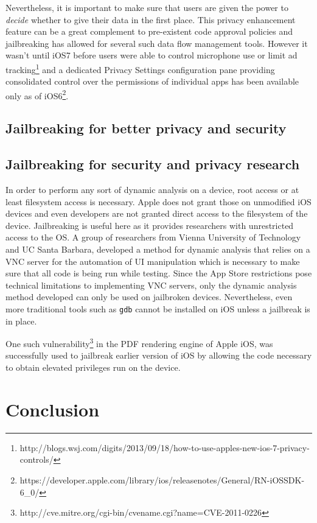 \documentclass[12pt, titlepage, oneside]{article}
\newcommand{\tab}{\hspace*{2em}}
\begin{document}
Nevertheless, it is important to make sure that users are given the power to \emph{decide} whether to give their data in the first place. This privacy enhancement feature can be a great complement to pre-existent code approval policies and jailbreaking has allowed for several such data flow management tools. However it wasn't until iOS7 before users were able to control microphone use or limit ad tracking\footnote{http://blogs.wsj.com/digits/2013/09/18/how-to-use-apples-new-ios-7-privacy-controls/} and a dedicated Privacy Settings configuration pane providing consolidated control over the permissions of individual apps has been available only as of iOS6\footnote{https://developer.apple.com/library/ios/releasenotes/General/RN-iOSSDK-6\_0/}. 

\tab \subsection{Jailbreaking for better privacy and security}

\subsection{Jailbreaking for security and privacy research}
In order to perform any sort of dynamic analysis on a device, root access or at least filesystem access is necessary. Apple does not grant those on unmodified iOS devices and even developers are not granted direct access to the filesystem of the device. Jailbreaking is useful here as it provides researchers with unrestricted access to the OS. 
A group of researchers from Vienna University of Technology and UC Santa Barbara\cite{dynamic}, developed a method for dynamic analysis that relies on a VNC server for the automation of UI manipulation which is necessary to make sure that all code is being run while testing. Since the App Store restrictions pose technical limitations to implementing VNC servers, only the dynamic analysis method developed can only be used on jailbroken devices. Nevertheless, even more traditional tools such as \texttt{gdb} cannot be installed on iOS unless a jailbreak is in place.

One such vulnerability\footnote{http://cve.mitre.org/cgi-bin/cvename.cgi?name=CVE-2011-0226} in the PDF rendering engine of Apple iOS\cite{pios}, was successfully used to jailbreak earlier version of iOS by allowing the code necessary to obtain elevated privileges run on the device. 


\section{Conclusion}


\nocite{*} 




\end{document}
